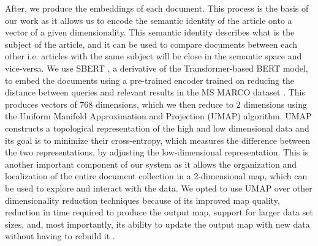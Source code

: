 \documentclass[a4paper]{article}
\begin{document}
After, we produce the embeddings of each document. This process is the basis of our work as it allows us to encode the semantic identity of the article onto a vector of a given dimensionality. This semantic identity describes what is the subject of the article, and it can be used to compare documents between each other i.e. articles with the same subject will be close in the semantic space and vice-versa. We use SBERT \citep{reimers2019}, a derivative of the Transformer-based BERT model, to embed the documents using a pre-trained encoder trained on reducing the distance between queries and relevant results in the MS MARCO dataset \citep{bajaj2018}. This produces vectors of 768 dimensions, which we then reduce to 2 dimensions using the Uniform Manifold Approximation and Projection (UMAP) \citep{mcinnes2020} algorithm. UMAP constructs a topological representation of the high and low dimensional data and its goal is to minimize their cross-entropy, which measures the difference between the two representations, by adjusting the low-dimensional representation. This is another important component of our system as it allows the organization and localization of the entire document collection in a 2-dimensional map, which can be used to explore and interact with the data. We opted to use UMAP over other dimensionality reduction techniques because of its improved map quality, reduction in time required to produce the output map, support for larger data set sizes, and, most importantly, its ability to update the output map with new data without having to rebuild it \citep{mcinnes2020}.
\end{document}
